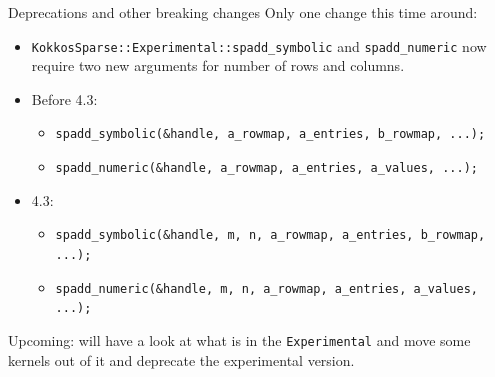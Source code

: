 \begin{frame}{Deprecations and other breaking changes}
Only one change this time around:
\begin{itemize}
  \item {\tt KokkosSparse::Experimental::spadd\_symbolic} and {\tt spadd\_numeric} now require two new arguments for number of rows and columns.
  \item Before 4.3:
  \begin{itemize}
    \item \texttt{spadd\_symbolic(\&handle, a\_rowmap, a\_entries, b\_rowmap, ...);}
    \item \texttt{spadd\_numeric(\&handle, a\_rowmap, a\_entries, a\_values, ...);}
  \end{itemize}
  \item 4.3:
  \begin{itemize}
    \item \texttt{spadd\_symbolic(\&handle, m, n, a\_rowmap, a\_entries, b\_rowmap, ...);}
    \item \texttt{spadd\_numeric(\&handle, m, n, a\_rowmap, a\_entries, a\_values, ...);}
  \end{itemize}
\end{itemize}

Upcoming: will have a look at what is in the {\tt Experimental} and move some kernels out of it and deprecate the experimental version.

\end{frame}


